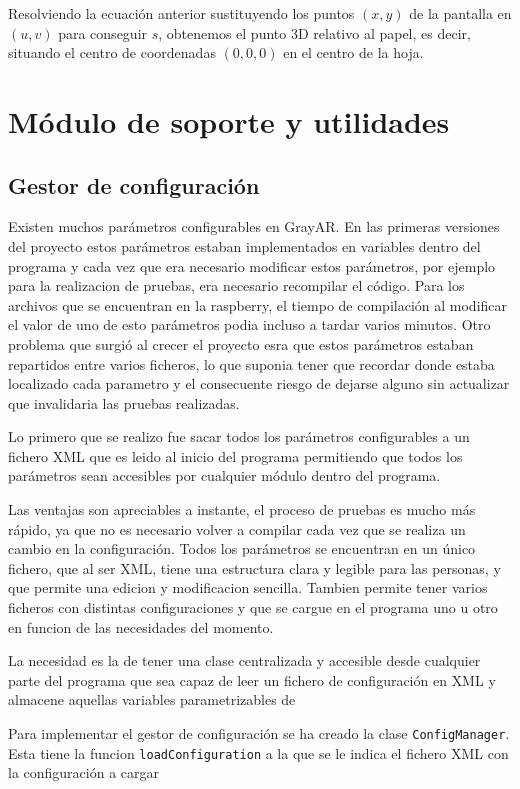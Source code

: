 Resolviendo la ecuación anterior sustituyendo los puntos $(x,y)$ de la
pantalla en $(u,v)$ para conseguir $s$, obtenemos el punto 3D relativo
al papel, es decir, situando el centro de coordenadas $(0,0,0)$ en el
centro de la hoja.



\section{Módulo de soporte y utilidades}
\subsection{Gestor de configuración}
Existen muchos parámetros configurables en GrayAR. En las primeras versiones del proyecto estos parámetros estaban implementados en variables dentro del programa y cada vez que era necesario modificar estos parámetros, por ejemplo para la realizacion de pruebas, era necesario recompilar el código. Para los archivos que se encuentran en la raspberry, el tiempo de compilación al modificar el valor de uno de esto parámetros podia incluso a tardar varios minutos. Otro problema que surgió al crecer el proyecto esra que estos parámetros estaban repartidos entre varios ficheros, lo que suponia tener que recordar donde estaba localizado cada parametro y el consecuente riesgo de dejarse alguno sin actualizar que invalidaria las pruebas realizadas.

Lo primero que se realizo fue sacar todos los parámetros configurables a un fichero \acs{XML} que es leido al inicio del programa permitiendo que todos los parámetros sean accesibles por cualquier módulo dentro del programa.

Las ventajas son apreciables a instante, el proceso de pruebas es mucho más rápido, ya que no es necesario volver a compilar cada vez que se realiza un cambio en la configuración. Todos los parámetros se encuentran en un único fichero, que al ser \acs{XML}, tiene una estructura clara y legible para las personas, y que permite una edicion y modificacion sencilla. Tambien permite tener varios ficheros con distintas configuraciones y que se cargue en el programa uno u otro en funcion de las necesidades del momento.
 
La necesidad es la de tener una clase centralizada y accesible desde cualquier parte del programa que sea capaz de leer un fichero de configuración en \acs{XML} y almacene aquellas variables parametrizables de

Para implementar el gestor de configuración se ha creado la clase  \texttt{ConfigManager}. Esta tiene la funcion  \texttt{loadConfiguration} a la que se le indica el fichero \acs{XML} con la configuración a cargar 

